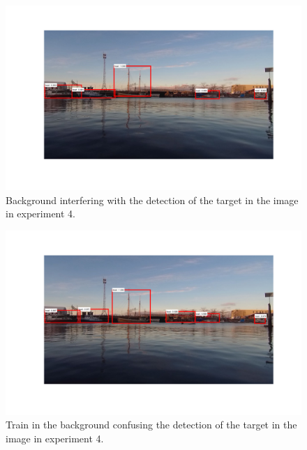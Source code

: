 \begin{figure}[!htb]
	\centering
	\includegraphics[width=\linewidth]{fig/ex4_miss.png}
	\caption{Background interfering with the detection of the target in the image in experiment 4.}
	\label{fig:issues_ex4}
\end{figure}
\begin{figure}[!htb]
	\centering
	\includegraphics[width=\linewidth]{fig/ex4_train.png}
	\caption{Train in the background confusing the detection of the target in the image in experiment 4.}
	\label{fig:issues_ex4_train}
\end{figure}

